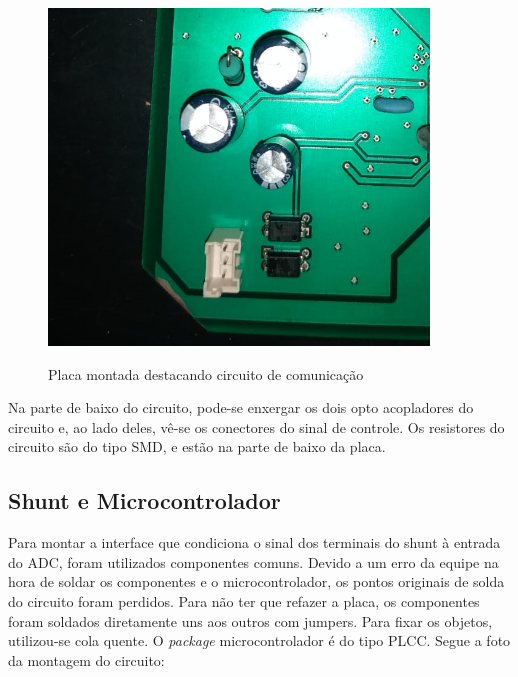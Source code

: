 \begin{figure}[H]
    \centering
    \caption{Placa montada destacando circuito de comunicação}
    \includegraphics[width=0.9\textwidth]{./dados/figuras/placa_comm.png}
    \label{fig:figura-montagem-comm}
\end{figure}

Na parte de baixo do circuito, pode-se enxergar os dois opto acopladores do circuito e, ao lado deles, vê-se os conectores do sinal de controle. Os resistores do circuito são do tipo SMD, e estão na parte de baixo da placa.

\subsection{Shunt e Microcontrolador}
Para montar a interface que condiciona o sinal dos terminais do shunt à entrada do ADC, foram utilizados componentes comuns. Devido a um erro da equipe na hora de soldar os componentes e o microcontrolador, os pontos originais de solda do circuito foram perdidos. Para não ter que refazer a placa, os componentes foram soldados diretamente uns aos outros com jumpers. Para fixar os objetos, utilizou-se cola quente. O \textit{package} microcontrolador é do tipo PLCC. Segue a foto da montagem do circuito:

